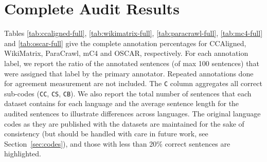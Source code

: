 \section{Complete Audit Results}\label{app:stats}
Tables \ref{tab:ccaligned-full}, \ref{tab:wikimatrix-full}, \ref{tab:paracrawl-full}, \ref{tab:mc4-full} and \ref{tab:oscar-full} give the complete annotation percentages for CCAligned, WikiMatrix, ParaCrawl, mC4 and OSCAR, respectively. For each annotation label, we report the ratio of the annotated sentences (of max 100 sentences) that were assigned that label by the primary annotator. Repeated annotations done for agreement measurement are not included. The \texttt{C} column aggregates all correct sub-codes (\texttt{CC}, \texttt{CS}, \texttt{CB}). We also report the total number of sentences that each dataset contains for each language and the average sentence length for the audited sentences to illustrate differences across languages. The original language codes as they are published with the datasets are maintained for the sake of consistency (but should be handled with care in future work, see Section~\ref{sec:codes}), and those with less than 20\% correct sentences are highlighted.
